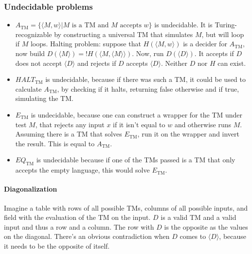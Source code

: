 \documentclass[9pt, twocolumn]{extarticle}
\begin{document}
\subsubsection{Undecidable problems}
\begin{itemize}
  \item $A_\text{TM}=\{\langle M,w\rangle | M\text{ is a TM and } M \text{ accepts }w\}$ is undecidable. It is Turing-recognizable by constructing a universal TM that simulates $M$, but will loop if $M$ loops. Halting problem: suppose that $H(\langle M,w\rangle)$ is a decider for $A_\text{TM}$, now build $D(\langle M\rangle)=!H(\langle M, \langle M\rangle\rangle)$. Now, run $D(\langle D\rangle)$. It accepts if $D$ does not accept $\langle D\rangle$ and rejects if $D$ accepts $\langle D\rangle$. Neither $D$ nor $H$ can exist.
  \item $HALT_\text{TM}$ is undecidable, because if there was such a TM, it could be used to calculate $A_\text{TM}$, by checking if it halts, returning false otherwise and if true, simulating the TM.
  \item $E_\text{TM}$ is undecidable, because one can construct a wrapper for the TM under test $M$, that rejects any input $x$ if it isn't equal to $w$ and otherwise runs $M$. Assuming there is a TM that solves $E_\text{TM}$, run it on the wrapper and invert the result. This is equal to $A_\text{TM}$.
  \item $EQ_\text{TM}$ is undecidable because if one of the TMs passed is a TM that only accepts the empty language, this would solve $E_\text{TM}$.
\end{itemize}

\paragraph{Diagonalization}
Imagine a table with rows of all possible TMs, columns of all possible inputs, and field with the evaluation of the TM on the input. $D$ is a valid TM and a valid input and thus a row and a column. The row with $D$ is the opposite as the values on the diagonal. There's an obvious contradiction when $D$ comes to $\langle D\rangle$, because it needs to be the opposite of itself.
\end{document}
